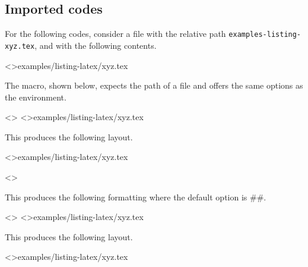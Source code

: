 \documentclass{tutodoc}
\begin{document}
\subsection{Imported codes}

For the following codes, consider a file with the relative path \verb+examples-listing-xyz.tex+, and with the following contents.

\tdoclatexinput<>{examples/listing-latex/xyz.tex}

\medskip

The  macro, shown below, expects the path of a file and offers the same options as the  environment.




\begin{tdocexa}
    \leavevmode

    \begin{tdoclatex}<>
\tdoclatexinput<>{examples/listing-latex/xyz.tex}
    \end{tdoclatex}

    This produces the following layout.

    \tdoclatexinput<>{examples/listing-latex/xyz.tex}
\end{tdocexa}




\begin{tdocexa}[Following]
    \leavevmode

    \begin{tdoclatex}<>
    \end{tdoclatex}

    This produces the following formatting where the default option is \tdoclatexin##.

\end{tdocexa}




\begin{tdocexa}
    \leavevmode

    \begin{tdoclatex}<>
\tdoclatexinput<>{examples/listing-latex/xyz.tex}
    \end{tdoclatex}

    This produces the following layout.

    \tdoclatexinput<>{examples/listing-latex/xyz.tex}
\end{tdocexa}
\end{document}
